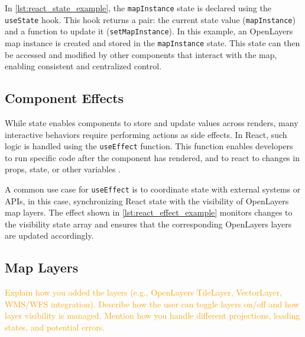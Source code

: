 In \autoref{lst:react_state_example}, the \texttt{mapInstance} state is declared using the \texttt{useState} hook. This hook returns a pair: the current state value (\texttt{mapInstance}) and a function to update it (\texttt{setMapInstance}). In this example, an OpenLayers map instance is created and stored in the \texttt{mapInstance} state. This state can then be accessed and modified by other components that interact with the map, enabling consistent and centralized control.

\begin{figure}[h]

\end{figure}

\subsection{Component Effects}

While state enables components to store and update values across renders, many interactive behaviors require performing actions as side effects. In React, such logic is handled using the \texttt{useEffect} function. This function enables developers to run specific code after the component has rendered, and to react to changes in props, state, or other variables \cite{react_useEffect}.

A common use case for \texttt{useEffect} is to coordinate state with external systems or APIs, in this case, synchronizing React state with the visibility of OpenLayers map layers. The effect shown in \autoref{lst:react_effect_example} monitors changes to the visibility state array and ensures that the corresponding OpenLayers layers are updated accordingly.

\begin{figure}[h]

\end{figure}

\subsection{Map Layers}

\textcolor{orange}{Explain how you added the layers (e.g., OpenLayers TileLayer, VectorLayer, WMS/WFS integration).
Describe how the user can toggle layers on/off and how layer visibility is managed.
Mention how you handle different projections, loading states, and potential errors.}



